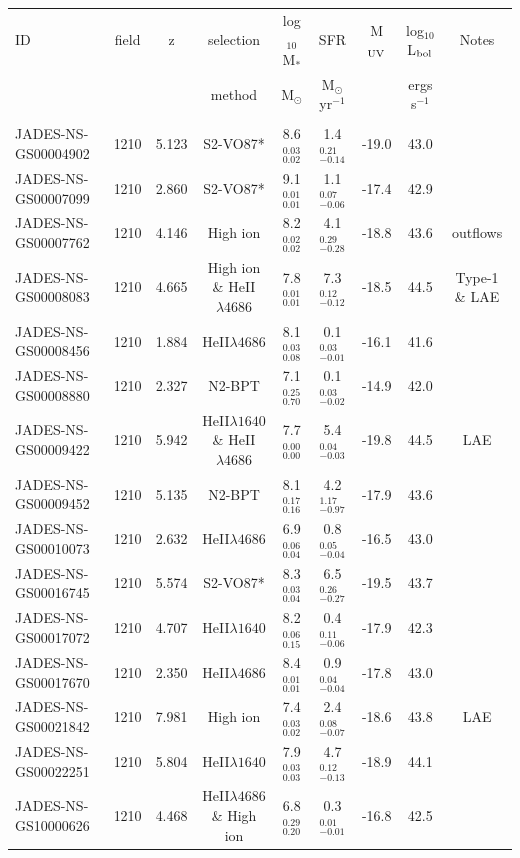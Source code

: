 \begin{tabular}{@{}lcccccccc@{}}
\hline
\hline
ID & field &z& selection & log$_{10}$ M$_{*}$ & SFR & M$_{\rm UV}$ & log$_{10}$ L$_{\rm bol}$  & Notes\\
  &  & & method    & M$_{\odot}$       &M$_{\odot}$ yr$^{-1}$ & & ergs s$^{-1}$ \\
 \\
\hline
JADES-NS-GS00004902& 1210 &  5.123&S2-VO87*&  8.6$^{0.03}_{0.02}$&  1.4$^{0.21}_{-0.14}$& -19.0&  43.0&\\
JADES-NS-GS00007099& 1210 &  2.860&S2-VO87*&  9.1$^{0.01}_{0.01}$&  1.1$^{0.07}_{-0.06}$& -17.4&  42.9&\\
JADES-NS-GS00007762& 1210 &  4.146&High ion&  8.2$^{0.02}_{0.02}$&  4.1$^{0.29}_{-0.28}$& -18.8&  43.6&outflows\\
JADES-NS-GS00008083& 1210 &  4.665&High ion \& HeII$\lambda4686$&  7.8$^{0.01}_{0.01}$&  7.3$^{0.12}_{-0.12}$& -18.5&  44.5&Type-1 \& LAE\\
JADES-NS-GS00008456& 1210 &  1.884&HeII$\lambda4686$&  8.1$^{0.03}_{0.08}$&  0.1$^{0.03}_{-0.01}$& -16.1&  41.6&\\
JADES-NS-GS00008880& 1210 &  2.327&N2-BPT&  7.1$^{0.25}_{0.70}$&  0.1$^{0.03}_{-0.02}$& -14.9&  42.0&\\
JADES-NS-GS00009422& 1210 &  5.942&HeII$\lambda1640$ \& HeII$\lambda4686$&  7.7$^{0.00}_{0.00}$&  5.4$^{0.04}_{-0.03}$& -19.8&  44.5&LAE\\
JADES-NS-GS00009452& 1210 &  5.135&N2-BPT&  8.1$^{0.17}_{0.16}$&  4.2$^{1.17}_{-0.97}$& -17.9&  43.6&\\
JADES-NS-GS00010073& 1210 &  2.632&HeII$\lambda4686$&  6.9$^{0.06}_{0.04}$&  0.8$^{0.05}_{-0.04}$& -16.5&  43.0&\\
JADES-NS-GS00016745& 1210 &  5.574&S2-VO87*&  8.3$^{0.03}_{0.04}$&  6.5$^{0.26}_{-0.27}$& -19.5&  43.7&\\
JADES-NS-GS00017072& 1210 &  4.707&HeII$\lambda1640$&  8.2$^{0.06}_{0.15}$&  0.4$^{0.11}_{-0.06}$& -17.9&  42.3&\\
JADES-NS-GS00017670& 1210 &  2.350&HeII$\lambda4686$&  8.4$^{0.01}_{0.01}$&  0.9$^{0.04}_{-0.04}$& -17.8&  43.0&\\
JADES-NS-GS00021842& 1210 &  7.981&High ion&  7.4$^{0.03}_{0.02}$&  2.4$^{0.08}_{-0.07}$& -18.6&  43.8&LAE\\
JADES-NS-GS00022251& 1210 &  5.804&HeII$\lambda1640$&  7.9$^{0.03}_{0.03}$&  4.7$^{0.12}_{-0.13}$& -18.9&  44.1&\\
JADES-NS-GS10000626& 1210 &  4.468&HeII$\lambda4686$ \& High ion&  6.8$^{0.29}_{0.20}$&  0.3$^{0.01}_{-0.01}$& -16.8&  42.5&\\

\end{tabular}
